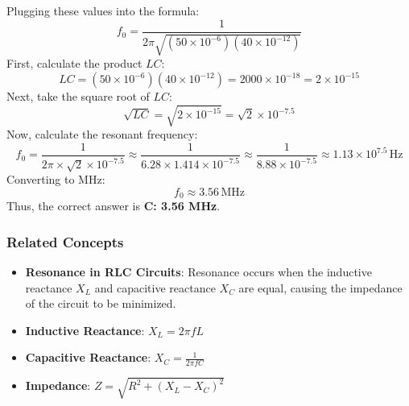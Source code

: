 Plugging these values into the formula:
\[
f_0 = \frac{1}{2\pi\sqrt{(50 \times 10^{-6})(40 \times 10^{-12})}}
\]
First, calculate the product \( LC \):
\[
LC = (50 \times 10^{-6})(40 \times 10^{-12}) = 2000 \times 10^{-18} = 2 \times 10^{-15}
\]
Next, take the square root of \( LC \):
\[
\sqrt{LC} = \sqrt{2 \times 10^{-15}} = \sqrt{2} \times 10^{-7.5}
\]
Now, calculate the resonant frequency:
\[
f_0 = \frac{1}{2\pi \times \sqrt{2} \times 10^{-7.5}} \approx \frac{1}{6.28 \times 1.414 \times 10^{-7.5}} \approx \frac{1}{8.88 \times 10^{-7.5}} \approx 1.13 \times 10^{7.5} \, \text{Hz}
\]
Converting to MHz:
\[
f_0 \approx 3.56 \, \text{MHz}
\]
Thus, the correct answer is \textbf{C: 3.56 MHz}.

\subsubsection{Related Concepts}
\begin{itemize}
    \item \textbf{Resonance in RLC Circuits}: Resonance occurs when the inductive reactance \( X_L \) and capacitive reactance \( X_C \) are equal, causing the impedance of the circuit to be minimized.
    \item \textbf{Inductive Reactance}: \( X_L = 2\pi f L \)
    \item \textbf{Capacitive Reactance}: \( X_C = \frac{1}{2\pi f C} \)
    \item \textbf{Impedance}: \( Z = \sqrt{R^2 + (X_L - X_C)^2} \)
\end{itemize}

